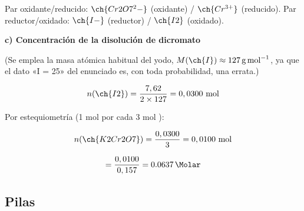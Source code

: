 \begin{exerciseEVAU}
\begin{solu}
        Par oxidante/reducido: \(\ch{Cr2O7^2-}\) (oxidante) / \(\ch{Cr^{3+}}\) (reducido). Par reductor/oxidado: \(\ch{I-}\) (reductor) / \(\ch{I2}\) (oxidado).

        \textbf{c) Concentración de la disolución de dicromato}

        (Se emplea la masa atómica habitual del yodo, \(M(\ch{I}) \approx \SI{127}{\gram\per\mole}\), ya que el dato «I = 25» del enunciado es, con toda probabilidad, una errata.)

        \begin{equation*}
            n(\ch{I2}) = \dfrac{7,62}{2\times127} = 0,0300 \ \text{mol}
        \end{equation*}

        Por estequiometría (1 mol  por cada 3 mol ):

        \begin{equation*}
            n(\ch{K2Cr2O7}) = \dfrac{0,0300}{3} = 0,0100 \ \text{mol}
        \end{equation*}

        \begin{equation*}
            [\ch{K2Cr2O7}] = \dfrac{0,0100}{0,157} = \SI{0.0637}{\Molar}
        \end{equation*}

    \end{solu}
\end{exerciseEVAU}

\subsection{Pilas}

